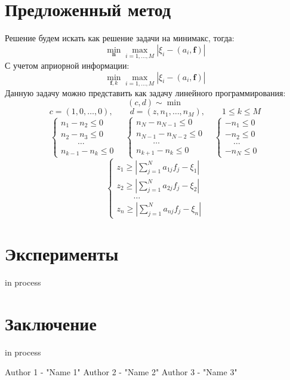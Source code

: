 \documentclass[a4paper,12pt]{article}
\theoremstyle{plain}
\theoremstyle{definition}
\theoremstyle{remark}
\begin{document}
\section{Предложенный метод}
Решение будем искать как решение задачи на минимакс,
тогда:
\begin{equation}
\min_{\pmb n} \max_{i = 1, \ldots, M}
\left| \xi_i - (a_i, \pmb f)\right|
\end{equation}
С учетом априорной информации:
\begin{equation}
\min_{\pmb f, k} \max_{i = 1, \ldots, M}
\left|
\xi_i - (a_i, \pmb f)
\right|
\end{equation}
Данную задачу можно представить как задачу линейного программирования:
\[
(c, d) \sim \min
\]
\[
c = (1, 0, \ldots, 0), \qquad
d = (z, n_1, \ldots, n_M), \qquad
1 \leq k \leq M
\]
\[
\begin{cases}
n_1-n_2 \leq 0 \\
n_2-n_3 \leq 0 \\
\qquad \ldots \\
n_{k-1} - n_k \leq 0
\end{cases}
\quad 
\begin{cases}
n_N-n_{N-1} \leq 0 \\
n_{N-1}-n_{N-2} \leq 0 \\
\qquad \ldots \\
n_{k+1} - n_{k} \leq 0
\end{cases}
\quad
\begin{cases}
-n_1 \leq 0 \\
-n_2 \leq 0 \\
\quad \ldots \\
-n_N \leq 0
\end{cases}
\]
\[
\begin{cases}
z_1 \geq
\left|
\sum_{j=1}^N a_{1j}f_j - \xi_1
\right| \\
z_2 \geq
\left|
\sum_{j=1}^N a_{2j}f_j - \xi_2
\right| \\
\qquad \ldots \\
z_n \geq
\left|
\sum_{j=1}^N a_{nj}f_j - \xi_n
\right|
\end{cases}
\]

\section{Эксперименты}
in process
\section{Заключение}
in process

\newpage
{}
\begin{thebibliography}{}
      Author 1  -  "Name 1"
      Author 2  -  "Name 2"
      Author 3  -  "Name 3"
\end{thebibliography}
\end{document}
